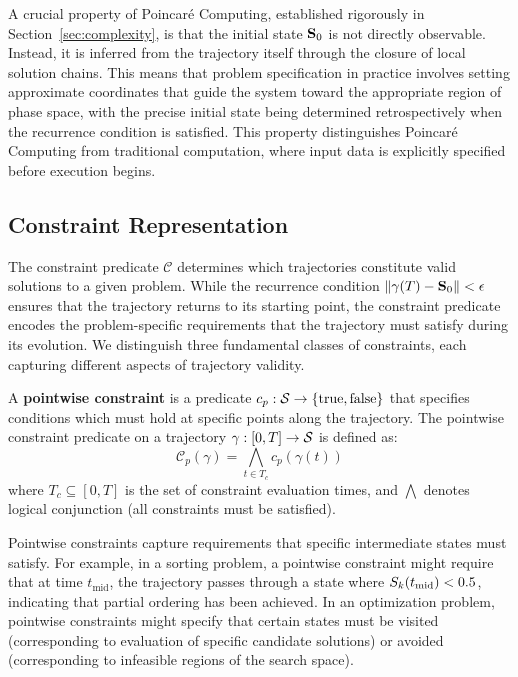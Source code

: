 \begin{remark}
\label{rem:unknowable_initial}
A crucial property of Poincaré Computing, established rigorously in Section~\ref{sec:complexity}, is that the initial state $\mathbf{S}_0$ is not directly observable. Instead, it is inferred from the trajectory itself through the closure of local solution chains. This means that problem specification in practice involves setting approximate coordinates that guide the system toward the appropriate region of phase space, with the precise initial state being determined retrospectively when the recurrence condition is satisfied. This property distinguishes Poincaré Computing from traditional computation, where input data is explicitly specified before execution begins.
\end{remark}

\subsection{Constraint Representation}

The constraint predicate $\mathcal{C}$ determines which trajectories constitute valid solutions to a given problem. While the recurrence condition $\|\gamma(T) - \mathbf{S}_0\| < \epsilon$ ensures that the trajectory returns to its starting point, the constraint predicate encodes the problem-specific requirements that the trajectory must satisfy during its evolution. We distinguish three fundamental classes of constraints, each capturing different aspects of trajectory validity.

\begin{definition}
\label{def:pointwise_constraints}
A \textbf{pointwise constraint} is a predicate $c_p: \mathcal{S} \to \{\text{true}, \text{false}\}$ that specifies conditions which must hold at specific points along the trajectory. The pointwise constraint predicate on a trajectory $\gamma: [0,T] \to \mathcal{S}$ is defined as:
\begin{equation}
\mathcal{C}_p(\gamma) = \bigwedge_{t \in T_c} c_p(\gamma(t))
\label{eq:pointwise_constraint}
\end{equation}
where $T_c \subseteq [0, T]$ is the set of constraint evaluation times, and $\bigwedge$ denotes logical conjunction (all constraints must be satisfied).
\end{definition}

Pointwise constraints capture requirements that specific intermediate states must satisfy. For example, in a sorting problem, a pointwise constraint might require that at time $t_{\text{mid}}$, the trajectory passes through a state where $S_k(t_{\text{mid}}) < 0.5$, indicating that partial ordering has been achieved. In an optimization problem, pointwise constraints might specify that certain states must be visited (corresponding to evaluation of specific candidate solutions) or avoided (corresponding to infeasible regions of the search space).

